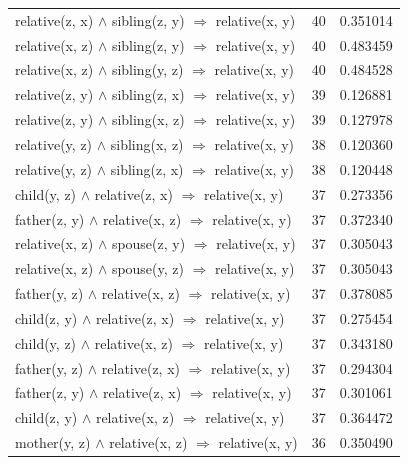 \begin{longtable}{lrr}
 relative(z, x) $\wedge$ sibling(z, y)   $\Rightarrow$ relative(x, y) &           40 &        0.351014 \\
 relative(x, z) $\wedge$ sibling(z, y)   $\Rightarrow$ relative(x, y) &           40 &        0.483459 \\
 relative(x, z) $\wedge$ sibling(y, z)   $\Rightarrow$ relative(x, y) &           40 &        0.484528 \\
 relative(z, y) $\wedge$ sibling(z, x)   $\Rightarrow$ relative(x, y) &           39 &        0.126881 \\
 relative(z, y) $\wedge$ sibling(x, z)   $\Rightarrow$ relative(x, y) &           39 &        0.127978 \\
 relative(y, z) $\wedge$ sibling(x, z)   $\Rightarrow$ relative(x, y) &           38 &        0.120360 \\
 relative(y, z) $\wedge$ sibling(z, x)   $\Rightarrow$ relative(x, y) &           38 &        0.120448 \\
   child(y, z) $\wedge$ relative(z, x)   $\Rightarrow$ relative(x, y) &           37 &        0.273356 \\
  father(z, y) $\wedge$ relative(x, z)   $\Rightarrow$ relative(x, y) &           37 &        0.372340 \\
  relative(x, z) $\wedge$ spouse(z, y)   $\Rightarrow$ relative(x, y) &           37 &        0.305043 \\
  relative(x, z) $\wedge$ spouse(y, z)   $\Rightarrow$ relative(x, y) &           37 &        0.305043 \\
  father(y, z) $\wedge$ relative(x, z)   $\Rightarrow$ relative(x, y) &           37 &        0.378085 \\
   child(z, y) $\wedge$ relative(z, x)   $\Rightarrow$ relative(x, y) &           37 &        0.275454 \\
   child(y, z) $\wedge$ relative(x, z)   $\Rightarrow$ relative(x, y) &           37 &        0.343180 \\
  father(y, z) $\wedge$ relative(z, x)   $\Rightarrow$ relative(x, y) &           37 &        0.294304 \\
  father(z, y) $\wedge$ relative(z, x)   $\Rightarrow$ relative(x, y) &           37 &        0.301061 \\
   child(z, y) $\wedge$ relative(x, z)   $\Rightarrow$ relative(x, y) &           37 &        0.364472 \\
  mother(y, z) $\wedge$ relative(x, z)   $\Rightarrow$ relative(x, y) &           36 &        0.350490 \\

\end{longtable}
